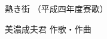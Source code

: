 \documentclass[10pt,b5j]{tarticle} %
\begin{document}
\begin{minipage}[c]{0.7\hsize} %
    \begin{center}
        {\LARGE
            熱き街 %
        }
        {\small 
            （平成四年度寮歌） %
        }
    \end{center}
\end{minipage}
\begin{minipage}[c]{0.3\hsize} %
    \begin{flushright} %
        美濃成夫君 作歌・作曲 %
    \end{flushright}
\end{minipage}
\end{document}
